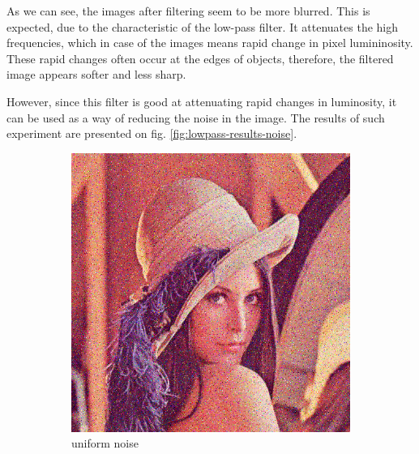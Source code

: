 \documentclass[12pt]{article}
\begin{document}
As we can see, the images after filtering seem to be more blurred.
This is expected, due to the characteristic of the low-pass filter.
It attenuates the high frequencies, which in case of the images means rapid change in pixel lumininosity.
These rapid changes often occur at the edges of objects, therefore, the filtered image appears softer and less sharp.

However, since this filter is good at attenuating rapid changes in luminosity, it can be used as a way of reducing the noise in the image.
The results of such experiment are presented on fig. \ref{fig:lowpass-results-noise}.

\begin{figure}[ht]\centering
    \begin{subfigure}[t]{\subfiguresize}
        \includegraphics[width=\textwidth]{lenac_uniform3.png}
        \caption{uniform noise}
    \end{subfigure}
    \begin{subfigure}[t]{\subfiguresize}

\end{subfigure}
\end{figure}
\end{document}
